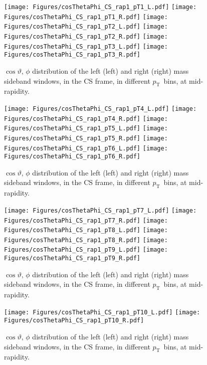 \documentclass[12pt]{article}
\newcommand{\pt}{$p_{\mathrm{T}}$}
\begin{document}

\begin{figure}[htbp]
\centering
\texttt{[image: Figures/cosThetaPhi\_CS\_rap1\_pT1\_L.pdf]}
\texttt{[image: Figures/cosThetaPhi\_CS\_rap1\_pT1\_R.pdf]}
\texttt{[image: Figures/cosThetaPhi\_CS\_rap1\_pT2\_L.pdf]}
\texttt{[image: Figures/cosThetaPhi\_CS\_rap1\_pT2\_R.pdf]}
\texttt{[image: Figures/cosThetaPhi\_CS\_rap1\_pT3\_L.pdf]}
\texttt{[image: Figures/cosThetaPhi\_CS\_rap1\_pT3\_R.pdf]}
\caption{$\cos\vartheta,\,\phi$ distribution of the left (left) and
  right (right) mass sideband windows, in the CS frame, in different
  \pt\ bins, at mid-rapidity.}
\end{figure}
\clearpage

\begin{figure}[htbp]
\centering
\texttt{[image: Figures/cosThetaPhi\_CS\_rap1\_pT4\_L.pdf]}
\texttt{[image: Figures/cosThetaPhi\_CS\_rap1\_pT4\_R.pdf]}
\texttt{[image: Figures/cosThetaPhi\_CS\_rap1\_pT5\_L.pdf]}
\texttt{[image: Figures/cosThetaPhi\_CS\_rap1\_pT5\_R.pdf]}
\texttt{[image: Figures/cosThetaPhi\_CS\_rap1\_pT6\_L.pdf]}
\texttt{[image: Figures/cosThetaPhi\_CS\_rap1\_pT6\_R.pdf]}
\caption{$\cos\vartheta,\,\phi$ distribution of the left (left) and
  right (right) mass sideband windows, in the CS frame, in different
  \pt\ bins, at mid-rapidity.} 
\end{figure}
\clearpage

\begin{figure}[htbp]
\centering
\texttt{[image: Figures/cosThetaPhi\_CS\_rap1\_pT7\_L.pdf]}
\texttt{[image: Figures/cosThetaPhi\_CS\_rap1\_pT7\_R.pdf]}
\texttt{[image: Figures/cosThetaPhi\_CS\_rap1\_pT8\_L.pdf]}
\texttt{[image: Figures/cosThetaPhi\_CS\_rap1\_pT8\_R.pdf]}
\texttt{[image: Figures/cosThetaPhi\_CS\_rap1\_pT9\_L.pdf]}
\texttt{[image: Figures/cosThetaPhi\_CS\_rap1\_pT9\_R.pdf]}
\caption{$\cos\vartheta,\,\phi$ distribution of the left (left) and
  right (right) mass sideband windows, in the CS frame, in different
  \pt\ bins, at mid-rapidity.}
\end{figure}
\clearpage

\begin{figure}[htbp]
\centering
\texttt{[image: Figures/cosThetaPhi\_CS\_rap1\_pT10\_L.pdf]}
\texttt{[image: Figures/cosThetaPhi\_CS\_rap1\_pT10\_R.pdf]}
\caption{$\cos\vartheta,\,\phi$ distribution of the left (left) and
  right (right) mass sideband windows, in the CS frame, in different
  \pt\ bins, at mid-rapidity.} 
\end{figure}
\clearpage
\end{document}

